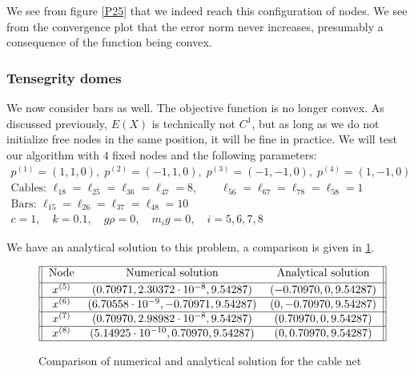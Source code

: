 We see from figure \ref{P25} that we indeed reach this configuration of nodes. We see from the convergence plot that the error norm never increases, presumably a consequence of the function being convex. \subsubsection{Tensegrity domes}
We now consider bars as well. The objective function is no longer convex. As discussed previously, $E(X)$ is technically not $C^1$, but as long as we do not initialize free nodes in the same position, it will be fine in practice. We will test our algorithm with $4$ fixed nodes and the following parameters:
\begin{equation*}
    \begin{gathered}
    p^{(1)} = (1,1,0),\; p^{(2)} = (-1,1,0),\; p^{(3)} = (-1,-1,0),\; p^{(4)} = (1,-1,0)\\
    \text{Cables: } \ell_{18} = \ell_{25} = \ell_{36} = \ell_{47} = 8, \qquad \ell_{56} = \ell_{67} = \ell_{78} = \ell_{58} = 1\\
    \text{Bars: }\ell_{15} = \ell_{26} = \ell_{37} = \ell_{48} = 10\\
    c=1, \quad k= 0.1, \quad g \rho = 0,\quad m_i g = 0, \quad i = 5,6,7,8
    \end{gathered}
\end{equation*}

We have an analytical solution to this problem, a comparison is given in \ref{P69Table}. 
\begin{figure}
\caption{Comparison of numerical and analytical solution for the cable net}
\begin{gather}   
\begin{tabular}{||c c c||} 
 \hline
 Node & Numerical solution & Analytical solution \\ [0.5ex] 
 \hline
$x^{(5)}$ & $(0.70971,2.30372 \cdot 10^{-8},9.54287)$ & $(-0.70970,0,9.54287)$  \\ 
 \hline
 $x^{(6)}$ & $(6.70558 \cdot 10^{-9},-0.70971,9.54287)$& $(0,-0.70970,9.54287)$  \\ 
 \hline
 $x^{(7)}$ & $(0.70970,2.98982 \cdot 10^{-8},9.54287)$ & $(0.70970,0,9.54287)$\\ 
 \hline
 $x^{(8)}$ & $(5.14925 \cdot 10^{-10},0.70970,9.54287)$ & $(0,0.70970,9.54287)$ \\ 
 \hline
\end{tabular}
\end{gather}
\label{P69Table}

\end{figure}

